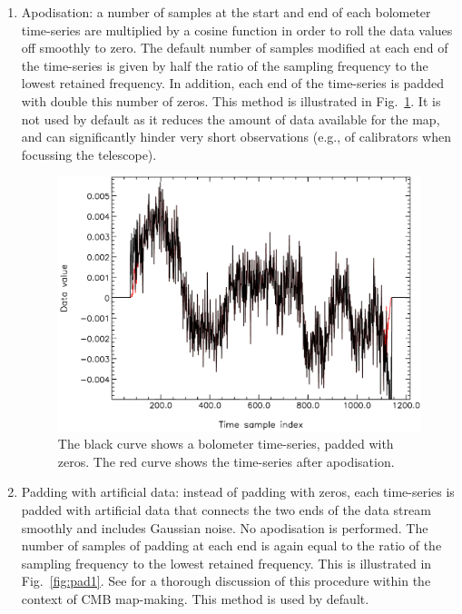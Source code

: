 \documentclass[useAMS,usenatbib,nofootinbib]{mn2e}
\begin{document}
\begin{enumerate}

\item Apodisation: a number of samples at the start and end of each
bolometer time-series are multiplied by a cosine function in order to
roll the data values off smoothly to zero. The default number of
samples modified at each end of the time-series is given by half the
ratio of the sampling frequency to the lowest retained frequency. In
addition, each end of the time-series is padded with double this
number of zeros. This method is illustrated in Fig.~\ref{fig:pad2}. It
is not used by default as it reduces the amount of data available for
the map, and can significantly hinder very short observations (e.g.,
of calibrators when focussing the telescope).

\begin{figure}
\centering
\includegraphics[width=\linewidth]{pad2}
\caption{The black curve shows a bolometer time-series, padded
with zeros. The red curve shows the time-series after apodisation.}
\label{fig:pad2}
\end{figure}

\item Padding with artificial data: instead of padding with zeros,
each time-series is padded with artificial data that connects the two
ends of the data stream smoothly and includes Gaussian noise. No
apodisation is performed. The number of samples of padding at each end
is again equal to the ratio of the sampling frequency to the lowest
retained frequency.  This is illustrated in Fig.~\ref{fig:pad1}. See
\citet{stompor2002} for a thorough discussion of this procedure within
the context of CMB map-making. This method is used by default.


\end{enumerate}
\end{document}
